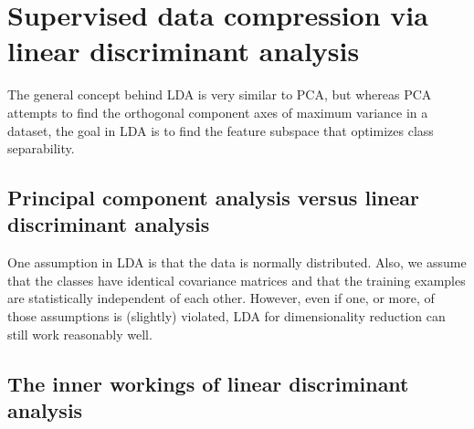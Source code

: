 \section{Supervised data compression via linear discriminant analysis}
The general concept behind LDA is very similar to PCA, but whereas PCA attempts to find the orthogonal component axes of maximum variance in a dataset, the goal in LDA is to find the feature subspace that optimizes class separability.

\subsection{Principal component analysis versus linear discriminant analysis}
One assumption in LDA is that the data is normally distributed. Also, we assume that the classes have identical covariance matrices and that the training examples are statistically independent of each other. However, even if one, or more, of those assumptions is (slightly) violated, LDA for dimensionality reduction can still work reasonably well.

\subsection{The inner workings of linear discriminant analysis}
\begin{algorithm}
    \Begin{

    }
\end{algorithm}